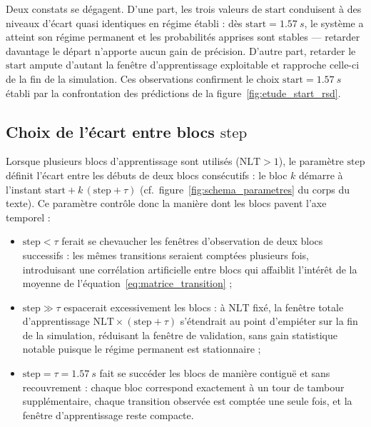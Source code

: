 \documentclass[french]{MemoireMaster}
\begin{document}
Deux constats se dégagent. D'une part, les trois valeurs de $\mathrm{start}$ conduisent à des niveaux d'écart quasi identiques en régime établi : dès $\mathrm{start} = \SI{1.57}{s}$, le système a atteint son régime permanent et les probabilités apprises sont stables --- retarder davantage le départ n'apporte aucun gain de précision. D'autre part, retarder le $\mathrm{start}$ ampute d'autant la fenêtre d'apprentissage exploitable et rapproche celle-ci de la fin de la simulation. Ces observations confirment le choix $\mathrm{start} = \SI{1.57}{s}$ établi par la confrontation des prédictions de la figure~\ref{fig:etude_start_rsd}.

\subsection{Choix de l'écart entre blocs $\mathrm{step}$}
\label{annexe:step}

Lorsque plusieurs blocs d'apprentissage sont utilisés ($\mathrm{NLT} > 1$), le paramètre $\mathrm{step}$ définit l'écart entre les débuts de deux blocs consécutifs : le bloc $k$ démarre à l'instant $\mathrm{start} + k\,(\mathrm{step} + \tau)$ (cf.\ figure~\ref{fig:schema_parametres} du corps du texte). Ce paramètre contrôle donc la manière dont les blocs pavent l'axe temporel :

\begin{itemize}[itemsep=2pt]
  \item $\mathrm{step} < \tau$ ferait se chevaucher les fenêtres d'observation de deux blocs successifs : les mêmes transitions seraient comptées plusieurs fois, introduisant une corrélation artificielle entre blocs qui affaiblit l'intérêt de la moyenne de l'équation~\eqref{eq:matrice_transition} ;
  \item $\mathrm{step} \gg \tau$ espacerait excessivement les blocs : à $\mathrm{NLT}$ fixé, la fenêtre totale d'apprentissage $\mathrm{NLT} \times (\mathrm{step} + \tau)$ s'étendrait au point d'empiéter sur la fin de la simulation, réduisant la fenêtre de validation, sans gain statistique notable puisque le régime permanent est stationnaire ;
  \item $\mathrm{step} = \tau = \SI{1.57}{s}$ fait se succéder les blocs de manière contiguë et sans recouvrement : chaque bloc correspond exactement à un tour de tambour supplémentaire, chaque transition observée est comptée une seule fois, et la fenêtre d'apprentissage reste compacte.
\end{itemize}
\end{document}
